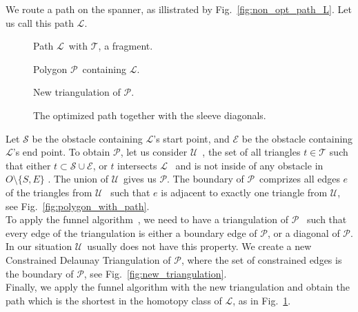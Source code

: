 \documentclass{gd-llncs}
\newcommand{\cdt}{$\mathcal{T}$}
\newcommand{\unpath}{$\mathcal{L}$}
\newcommand{\triset}{$\mathcal{U}$}
\newcommand{\plg}{$\mathcal{P}$}
\begin{document}
{We route a path on the spanner, as illistrated by Fig.~\ref{fig:non_opt_path_L}. Let us call this path \unpath.
\begin{figure}[!tbp]
  \centering
  \begin{minipage}[b]{0.45\textwidth}
    
    \caption{Path \unpath~with \cdt, a fragment.}
    \label{fig:non_opt_path_L}
  \end{minipage}
  \hfill
  \begin{minipage}[b]{0.45\textwidth}
    
    \caption{Polygon \plg~containing \unpath.}
    \label{fig:polygon_with_path}
  \end{minipage}
  \vfill
  \begin{minipage}[b]{0.45\textwidth}
    
    \caption{New triangulation of \plg.}
    \label{fig:new_triangulation}
  \end{minipage}
  \hfill
  \begin{minipage}[b]{0.45\textwidth}
    
    \caption{The optimized path together with the sleeve diagonals.}
    \label{fig:optimized_path}
  \end{minipage}
\end{figure}
Let $\mathcal{S}$ be the obstacle containing \unpath's start point, and $\mathcal{E}$ be the obstacle containing \unpath's end point.
To obtain \plg, let us consider \triset~, the set of all triangles ${t} \in \mathcal{T}$ such that
either ${t} \subset \mathcal{S} \cup \mathcal{E}$, or $t$ intersects \unpath~ and is not inside of any obstacle in $O \setminus \{S,E\}$  .
The union of \triset~gives us \plg. The boundary of \plg~comprizes all edges $e$ of the triangles from \triset~ such that $e$ is adjacent to exactly one triangle from \triset, see Fig.~\ref{fig:polygon_with_path}. \\
To apply the funnel algorithm~\cite{chazelle1982theorem,hershberger1994computing}, we need to have a triangulation of \plg~ such that every edge of the triangulation is either a boundary edge of \plg, or a diagonal of \plg. In our situation \triset~usually does not have this property. We create a new Constrained Delaunay Triangulation of \plg, where the set of constrained edges is the boundary of \plg, see Fig.~\ref{fig:new_triangulation}.\\
Finally, we apply the funnel algorithm with the new triangulation and obtain the path which is the shortest in the homotopy class of \unpath, as in Fig.~\ref{fig:optimized_path}.\\
}
\end{document}
